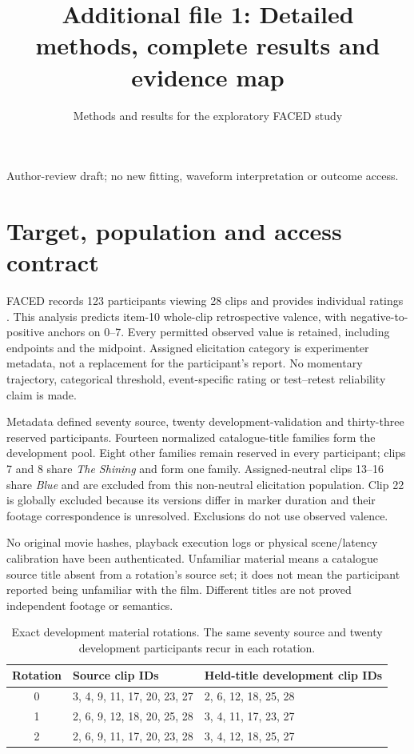 \documentclass[11pt,a4paper]{article}
\title{Additional file 1: Detailed methods, complete results and evidence map}
\author{\small Methods and results for the exploratory FACED study}
\date{}
\begin{document}
\doublespacing
\linenumbers
\maketitle
\begin{center}\small Author-review draft; no new fitting, waveform interpretation or outcome access.\end{center}

\section{Target, population and access contract}
FACED records 123 participants viewing 28 clips and provides individual ratings \cite{chen2023faced}. This analysis predicts item-10 whole-clip retrospective valence, with negative-to-positive anchors on 0--7. Every permitted observed value is retained, including endpoints and the midpoint. Assigned elicitation category is experimenter metadata, not a replacement for the participant's report. No momentary trajectory, categorical threshold, event-specific rating or test--retest reliability claim is made.

Metadata defined seventy source, twenty development-validation and thirty-three reserved participants. Fourteen normalized catalogue-title families form the development pool. Eight other families remain reserved in every participant; clips 7 and 8 share \emph{The Shining} and form one family. Assigned-neutral clips 13--16 share \emph{Blue} and are excluded from this non-neutral elicitation population. Clip 22 is globally excluded because its versions differ in marker duration and their footage correspondence is unresolved. Exclusions do not use observed valence.

No original movie hashes, playback execution logs or physical scene/latency calibration have been authenticated. Unfamiliar material means a catalogue source title absent from a rotation's source set; it does not mean the participant reported being unfamiliar with the film. Different titles are not proved independent footage or semantics.

\begin{table}[htbp]
\centering
\caption{Exact development material rotations. The same seventy source and twenty development participants recur in each rotation.}
\label{tab:rotations}
\small
\begin{tabular}{@{}cp{66mm}p{66mm}@{}}
\toprule
Rotation & Source clip IDs & Held-title development clip IDs\\
\midrule
0 & 3, 4, 9, 11, 17, 20, 23, 27 & 2, 6, 12, 18, 25, 28\\
1 & 2, 6, 9, 12, 18, 20, 25, 28 & 3, 4, 11, 17, 23, 27\\
2 & 2, 6, 9, 11, 17, 20, 23, 28 & 3, 4, 12, 18, 25, 27\\
\bottomrule
\end{tabular}
\end{table}
\end{document}
